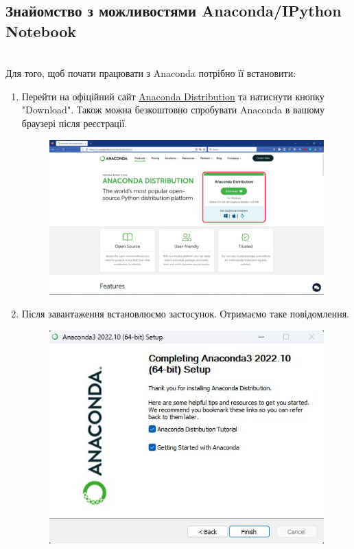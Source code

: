 \documentclass[a4paper,12pt]{article}
\begin{document}
    \subsection {Знайомство з можливостями Anaconda/IPython Notebook}
    \hrulefill \\
    Для того, щоб почати працювати з Anaconda потрібно її встановити:
    \begin{enumerate}
        \item Перейти на офіційний сайт \href{https://www.anaconda.com/products/distribution}{\underline{Anaconda Distribution}} 
        та натиснути кнопку "Download". Також можна безкоштовно спробувати Anaconda в вашому браузері після реєстрації.
        \begin{figure}[h!]
            \begin{center}
                \includegraphics[scale=0.35]{Prt sc/Figure_1.jpg}
            \end{center}
        \end{figure}
        \item Після завантаження встановлюємо застосунок. Отримаємо таке повідомлення.
        \begin{figure}[h!]
            \begin{center}
                \includegraphics[scale=0.8]{Prt sc/Figure_2.jpg}

\end{center}
\end{figure}
\end{enumerate}
\end{document}
